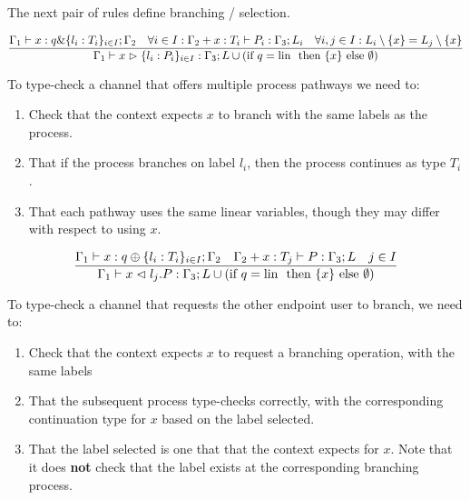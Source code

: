 The next pair of rules define branching / selection.

$$
\frac{\Gamma_1 \vdash x : q \& \{l_i : T_i\}_{i \in I} ; \Gamma_2 \quad \forall{i \in I}:\Gamma_2 + x : T_i \vdash P_i : \Gamma_3 ; L_i \quad \forall{i,j \in I} : L_i \setminus \{x\} = L_j \setminus \{x\}}{\Gamma_1 \vdash x \vartriangleright \{l_i : P_i\}_{i \in I} : \Gamma_3 ; L \cup (\text{if } q = \text{lin } \text{ then } \{x\} \text{ else } \emptyset)} \\
$$

To type-check a channel that offers multiple process pathways we need to:
\begin{enumerate}
    \item Check that the context expects $x$ to branch with the same labels as the process.
    \item That if the process branches on label $l_i$, then the process continues as type $T_i$.
    \item That each pathway uses the same linear variables, though they may differ with respect to using $x$. 
\end{enumerate}

$$
\frac{\Gamma_1 \vdash x : q \oplus \{l_i : T_i\}_{i \in I} ; \Gamma_2 \quad \Gamma_2 + x : T_j \vdash P : \Gamma_3 ; L \quad j \in I}{\Gamma_1 \vdash x \vartriangleleft l_j.P : \Gamma_3 ; L \cup (\text{if } q = \text{lin } \text{ then } \{x\} \text{ else } \emptyset)}
$$

To type-check a channel that requests the other endpoint user to branch, we need to:
\begin{enumerate}
    \item Check that the context expects $x$ to request a branching operation, with the same labels
    \item That the subsequent process type-checks correctly, with the corresponding continuation type for $x$ based on the label selected.
    \item That the label selected is one that that the context expects for $x$. Note that it does \textbf{not} check that the label exists at the corresponding branching process.
\end{enumerate}

